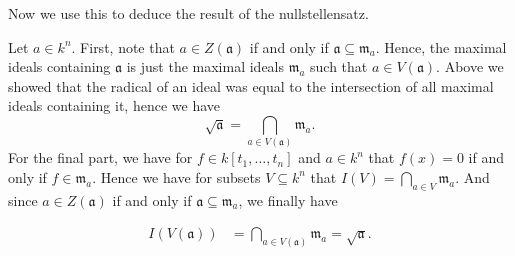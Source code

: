 Now we use this to deduce the result of the nullstellensatz. 

Let $a \in k^n$. First, note that $a \in Z(\mathfrak{a})$ if and only if $\mathfrak{a}\subseteq \mathfrak{m}_{a}$. Hence, the maximal ideals containing $\mathfrak{a}$ is just the maximal ideals $\mathfrak{m}_{a}$ such that $a \in V(\mathfrak{a})$. Above we showed that the radical of an ideal was equal to the intersection of all maximal ideals containing it, hence we have 
\begin{equation*}
    \sqrt{\mathfrak{a}} = \bigcap_{a \in V(\mathfrak{a})}\mathfrak{m}_{a}. 
\end{equation*}
For the final part, we have for $f\in k[t_1,\ldots,t_n]$ and $a\in k^n$ that $f(x) = 0$ if and only if $f \in \mathfrak{m}_{a}$. Hence we have for subsets $V\subseteq k^n$ that $I(V) = \bigcap_{a \in V}\mathfrak{m}_{a}$. And since $a \in Z(\mathfrak{a})$ if and only if $\mathfrak{a}\subseteq \mathfrak{m}_{a}$, we finally have

\begin{align*}
    I(V(\mathfrak{a})) 
    &= \bigcap_{a \in V(\mathfrak{a})}\mathfrak{m}_{a} = \sqrt{\mathfrak{a}}.
\end{align*}
